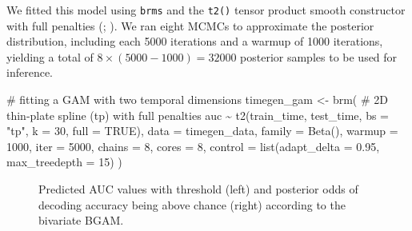 \documentclass[
  doc,
  floatsintext,
  longtable,
  a4paper,
  nolmodern,
  notxfonts,
  notimes,
  colorlinks=true,linkcolor=blue,citecolor=blue,urlcolor=blue]{apa7}
\newenvironment{Shaded}{\begin{snugshade}}{\end{snugshade}}
\newcommand{\AttributeTok}[1]{\textcolor[rgb]{0.40,0.45,0.13}{#1}}
\newcommand{\CommentTok}[1]{\textcolor[rgb]{0.37,0.37,0.37}{#1}}
\newcommand{\ConstantTok}[1]{\textcolor[rgb]{0.56,0.35,0.01}{#1}}
\newcommand{\DecValTok}[1]{\textcolor[rgb]{0.68,0.00,0.00}{#1}}
\newcommand{\FloatTok}[1]{\textcolor[rgb]{0.68,0.00,0.00}{#1}}
\newcommand{\FunctionTok}[1]{\textcolor[rgb]{0.28,0.35,0.67}{#1}}
\newcommand{\NormalTok}[1]{\textcolor[rgb]{0.00,0.23,0.31}{#1}}
\newcommand{\OtherTok}[1]{\textcolor[rgb]{0.00,0.23,0.31}{#1}}
\newcommand{\SpecialCharTok}[1]{\textcolor[rgb]{0.37,0.37,0.37}{#1}}
\newcommand{\StringTok}[1]{\textcolor[rgb]{0.13,0.47,0.30}{#1}}
\begin{document}
\setlength{\parindent}{0pt}
\setlength{\parskip}{6pt}

We fitted this model using \texttt{brms} and the \texttt{t2()} tensor
product smooth constructor with full penalties
(;
). We ran eight MCMCs to approximate
the posterior distribution, including each 5000 iterations and a warmup
of 1000 iterations, yielding a total of \(8 \times (5000-1000) = 32000\)
posterior samples to be used for inference.

\begin{Shaded}
\begin{Highlighting}[]
\CommentTok{\# fitting a GAM with two temporal dimensions}
\NormalTok{timegen\_gam }\OtherTok{\textless{}{-}} \FunctionTok{brm}\NormalTok{(}
    \CommentTok{\# 2D thin{-}plate spline (tp) with full penalties}
\NormalTok{    auc }\SpecialCharTok{\textasciitilde{}} \FunctionTok{t2}\NormalTok{(train\_time, test\_time, }\AttributeTok{bs =} \StringTok{"tp"}\NormalTok{, }\AttributeTok{k =} \DecValTok{30}\NormalTok{, }\AttributeTok{full =} \ConstantTok{TRUE}\NormalTok{),}
    \AttributeTok{data =}\NormalTok{ timegen\_data,}
    \AttributeTok{family =} \FunctionTok{Beta}\NormalTok{(),}
    \AttributeTok{warmup =} \DecValTok{1000}\NormalTok{,}
    \AttributeTok{iter =} \DecValTok{5000}\NormalTok{,}
    \AttributeTok{chains =} \DecValTok{8}\NormalTok{,}
    \AttributeTok{cores =} \DecValTok{8}\NormalTok{,}
    \AttributeTok{control =} \FunctionTok{list}\NormalTok{(}\AttributeTok{adapt\_delta =} \FloatTok{0.95}\NormalTok{, }\AttributeTok{max\_treedepth =} \DecValTok{15}\NormalTok{)}
\NormalTok{    )}
\end{Highlighting}
\end{Shaded}

\begin{figure}[!htb]

\caption{\label{fig-gam-timegen-post-preds}Predicted AUC values with
threshold (left) and posterior odds of decoding accuracy being above
chance (right) according to the bivariate BGAM.}


\end{figure}%
\end{document}
